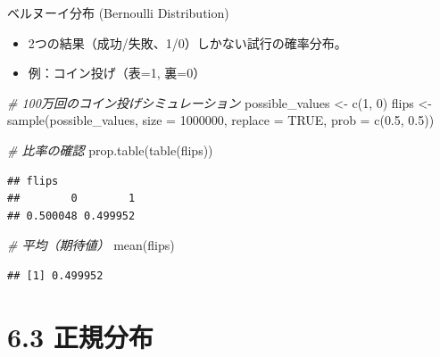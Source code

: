\documentclass[
  ignorenonframetext,
]{beamer}
\newenvironment{Shaded}{\begin{snugshade}}{\end{snugshade}}
\newcommand{\AttributeTok}[1]{\textcolor[rgb]{0.77,0.63,0.00}{#1}}
\newcommand{\CommentTok}[1]{\textcolor[rgb]{0.56,0.35,0.01}{\textit{#1}}}
\newcommand{\ConstantTok}[1]{\textcolor[rgb]{0.00,0.00,0.00}{#1}}
\newcommand{\DecValTok}[1]{\textcolor[rgb]{0.00,0.00,0.81}{#1}}
\newcommand{\FloatTok}[1]{\textcolor[rgb]{0.00,0.00,0.81}{#1}}
\newcommand{\FunctionTok}[1]{\textcolor[rgb]{0.00,0.00,0.00}{#1}}
\newcommand{\NormalTok}[1]{#1}
\newcommand{\OtherTok}[1]{\textcolor[rgb]{0.56,0.35,0.01}{#1}}
\providecommand{\tightlist}{%
  \setlength{\itemsep}{0pt}\setlength{\parskip}{0pt}}
\begin{document}
\begin{frame}[fragile]{ベルヌーイ分布 (Bernoulli Distribution)}
\protect\hypertarget{ux30d9ux30ebux30ccux30fcux30a4ux5206ux5e03-bernoulli-distribution}{}
\begin{itemize}
\tightlist
\item
  2つの結果（成功/失敗、1/0）しかない試行の確率分布。
\item
  例：コイン投げ（表=1, 裏=0）
\end{itemize}

\footnotesize

\begin{Shaded}
\begin{Highlighting}[]
\CommentTok{\# 100万回のコイン投げシミュレーション}
\NormalTok{possible\_values }\OtherTok{\textless{}{-}} \FunctionTok{c}\NormalTok{(}\DecValTok{1}\NormalTok{, }\DecValTok{0}\NormalTok{)}
\NormalTok{flips }\OtherTok{\textless{}{-}} \FunctionTok{sample}\NormalTok{(possible\_values, }\AttributeTok{size =} \DecValTok{1000000}\NormalTok{, }
                \AttributeTok{replace =} \ConstantTok{TRUE}\NormalTok{, }\AttributeTok{prob =} \FunctionTok{c}\NormalTok{(}\FloatTok{0.5}\NormalTok{, }\FloatTok{0.5}\NormalTok{))}

\CommentTok{\# 比率の確認}
\FunctionTok{prop.table}\NormalTok{(}\FunctionTok{table}\NormalTok{(flips))}
\end{Highlighting}
\end{Shaded}

\begin{verbatim}
## flips
##        0        1 
## 0.500048 0.499952
\end{verbatim}

\begin{Shaded}
\begin{Highlighting}[]
\CommentTok{\# 平均（期待値）}
\FunctionTok{mean}\NormalTok{(flips)}
\end{Highlighting}
\end{Shaded}

\begin{verbatim}
## [1] 0.499952
\end{verbatim}

\normalsize
\end{frame}

\hypertarget{ux6b63ux898fux5206ux5e03}{%
\section{6.3 正規分布}\label{ux6b63ux898fux5206ux5e03}}
\end{document}

